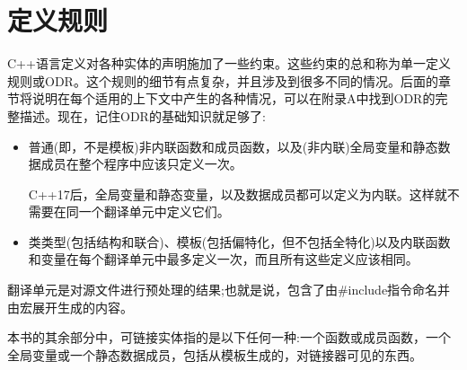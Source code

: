 \section{定义规则}
C++语言定义对各种实体的声明施加了一些约束。这些约束的总和称为单一定义规则或ODR。这个规则的细节有点复杂，并且涉及到很多不同的情况。后面的章节将说明在每个适用的上下文中产生的各种情况，可以在附录A中找到ODR的完整描述。现在，记住ODR的基础知识就足够了:

\begin{itemize}
\item 
普通(即，不是模板)非内联函数和成员函数，以及(非内联)全局变量和静态数据成员在整个程序中应该只定义一次。

\begin{notice}
C++17后，全局变量和静态变量，以及数据成员都可以定义为内联。这样就不需要在同一个翻译单元中定义它们。
\end{notice}

\item 
类类型(包括结构和联合)、模板(包括偏特化，但不包括全特化)以及内联函数和变量在每个翻译单元中最多定义一次，而且所有这些定义应该相同。
\end{itemize}

翻译单元是对源文件进行预处理的结果;也就是说，包含了由\#include指令命名并由宏展开生成的内容。

本书的其余部分中，可链接实体指的是以下任何一种:一个函数或成员函数，一个全局变量或一个静态数据成员，包括从模板生成的，对链接器可见的东西。




































